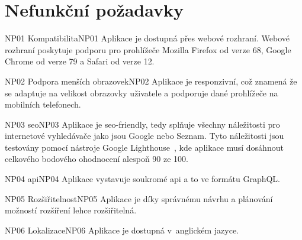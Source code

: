 \section{Nefunkční požadavky}
\label{sc:non_func_req}

\begin{requirment}{NP01 Kompatibilita}{NP01}
    Aplikace je dostupná přes webové rozhraní. Webové rozhraní poskytuje podporu pro prohlížeče Mozilla Firefox od verze 68, Google Chrome od verze 79 a Safari od verze 12.
\end{requirment}

\begin{requirment}{NP02 Podpora menších obrazovek}{NP02}
    Aplikace je responzivní, což znamená že se adaptuje na velikost obrazovky uživatele a podporuje dané prohlížeče na mobilních telefonech.
\end{requirment}

\begin{requirment}{NP03 \acrshort{seo}}{NP03}
    Aplikace je \acrshort{seo}-friendly, tedy splňuje všechny náležitosti pro internetové vyhledávače jako jsou Google nebo Seznam. Tyto náležitosti jsou testovány pomocí nástroje Google Lighthouse~\cite{googlellc_2019_lighthouse}, kde aplikace musí dosáhnout celkového bodového ohodnocení alespoň 90 ze 100.
\end{requirment}

\begin{requirment}{NP04 \acrshort{api}}{NP04}
    Aplikace vystavuje soukromé \acrshort{api} a to ve formátu GraphQL.
\end{requirment}

\begin{requirment}{NP05 Rozšiřitelnost}{NP05}
    Aplikace je díky správnému návrhu a plánování možností rozšíření lehce rozšiřitelná.
\end{requirment}

\begin{requirment}{NP06 Lokalizace}{NP06}
    Aplikace je dostupná v~anglickém jazyce.
\end{requirment}

